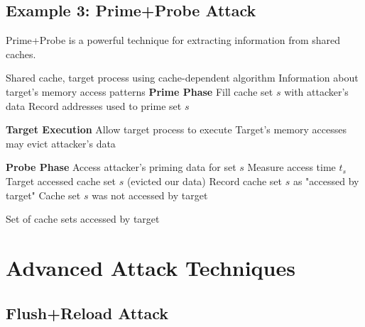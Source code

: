 \documentclass[11pt,a4paper]{article}
\theoremstyle{definition}
\begin{document}
\subsection{Example 3: Prime+Probe Attack}

Prime+Probe is a powerful technique for extracting information from shared caches.

\begin{algorithm}
\caption{Prime+Probe Cache Attack}
\begin{algorithmic}[1]
\REQUIRE Shared cache, target process using cache-dependent algorithm
\ENSURE Information about target's memory access patterns
\STATE \textbf{Prime Phase}
    \STATE Fill cache set $s$ with attacker's data
    \STATE Record addresses used to prime set $s$
\ENDFOR

\STATE \textbf{Target Execution}
\STATE Allow target process to execute
\STATE Target's memory accesses may evict attacker's data

\STATE \textbf{Probe Phase}  
    \STATE Access attacker's priming data for set $s$
    \STATE Measure access time $t_s$
        \STATE Target accessed cache set $s$ (evicted our data)
        \STATE Record cache set $s$ as "accessed by target"
    \ELSE
        \STATE Cache set $s$ was not accessed by target
    \ENDIF
\ENDFOR

\RETURN Set of cache sets accessed by target
\end{algorithmic}
\end{algorithm}

\section{Advanced Attack Techniques}

\subsection{Flush+Reload Attack}
\end{document}
